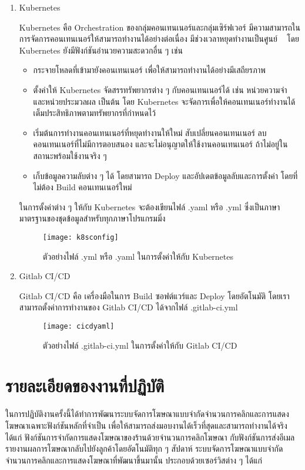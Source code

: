 \begin{enumerate}
	\item Kubernetes	
	
	Kubernetes คือ Orchestration ของกลุ่มคอนเทนเนอร์และกลุ่มเซิร์ฟเวอร์ มีความสามารถในการจัดการคอนเทนเนอร์ให้สามารถทำงานได้อย่างต่อเนื่อง มีช่วงเวลาหยุดทำงานเป็นศูนย์ 	 ~\cite{kubernetes} โดย Kubernetes ยังมีฟังก์ชันอำนวยความสะดวกอื่น ๆ เช่น
	\begin{itemize}
		\item กระจายโหลดที่เข้ามายังคอนเทนเนอร์ เพื่อให้สามารถทำงานได้อย่างมีเสถียรภาพ
		\item ตั้งค่าให้ Kubernetes จัดสรรทรัพยากรต่าง ๆ กับคอนเทนเนอร์ได้ เช่น หน่วยความจำ และหน่วยประมวลผล เป็นต้น โดย Kubernetes จะจัดการเพื่อให้คอนเทนเนอร์ทำงานได้เต็มประสิทธิภาพตามทรัพยากรที่กำหนดไว้
		\item เริ่มต้นการทำงานคอนเทนเนอร์ที่หยุดทำงานให้ใหม่ สับเปลี่ยนคอนเทนเนอร์ ลบคอนเทนเนอร์ที่ไม่มีการตอบสนอง และจะไม่อนุญาตให้ใช้งานคอนเทนเนอร์ ถ้าไม่อยู่ในสถานะพร้อมใช้งานจริง ๆ
		\item เก็บข้อมูลความลับต่าง ๆ ได้ โดยสามารถ Deploy และอัปเดตข้อมูลลับและการตั้งค่า โดยที่ไม่ต้อง Build คอนเทนเนอร์ใหม่
	\end{itemize}
	ในการตั้งค่าต่าง ๆ ให้กับ Kubernetes จะต้องเขียนไฟล์ .yaml หรือ .yml ซึ่งเป็นภาษามาตรฐานของชุดข้อมูลสำหรับทุกภาษาโปรแกรมมิ่ง ~\cite{yaml}
	
	\begin{figure}[!h]
		\centering
		\texttt{[image: k8sconfig]}  
		\caption{ตัวอย่างไฟล์ .yml หรือ .yaml ในการตั้งค่าให้กับ Kubernetes}
		\label{Fig:cicdyaml}
	\end{figure}
	
	\item Gitlab CI/CD
	
	Gitlab CI/CD คือ เครื่องมือในการ Build ซอฟต์แวร์และ Deploy โดยอัตโนมัติ โดยเราสามารถตั้งค่าการทำงานของ Gitlab CI/CD ได้จากไฟล์ .gitlab-ci.yml ~\cite{gitlabcicd}
	
	\begin{figure}[!h]
		\centering
		\texttt{[image: cicdyaml]}  
		\caption{ตัวอย่างไฟล์ .gitlab-ci.yml ในการตั้งค่าให้กับ Gitlab CI/CD}
		\label{Fig:cicdyaml}
	\end{figure}		
\end{enumerate}

\section{รายละเอียดของงานที่ปฏิบัติ}
ในการปฏิบัติงานครั้งนี้ได้ทำการพัฒนาระบบจัดการโฆษณาแบบจำกัดจำนวนการคลิกและการแสดงโฆษณาเฉพาะฟังก์ชันหลักที่จำเป็น เพื่อให้สามารถส่งมอบงานได้เร็วที่สุดและสามารถทำงานได้จริง ได้แก่ ฟังก์ชันการจำกัดการแสดงโฆษณาของร้านด้วยจำนวนการคลิกโฆษณา กับฟังก์ชันการส่งอีเมลรายงานผลการโฆษณากลับไปยังลูกค้าโดยอัตโนมัติทุก ๆ สัปดาห์ 
ระบบจัดการโฆษณาแบบจำกัดจำนวนการคลิกและการแสดงโฆษณาที่พัฒนาขึ้นมานั้น ประกอบด้วยเซอร์วิสต่าง ๆ ได้แก่

